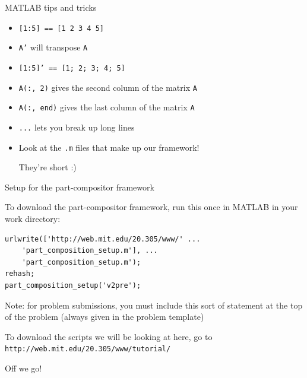 \documentclass[handout]{beamer} %
\newcommand{\br}{\vspace{\baselineskip}}
\begin{document}
\begin{frame}{MATLAB tips and tricks}
\begin{itemize}
    \item \texttt{[1:5] == [1 2 3 4 5]}
    \item \texttt{A'} will transpose \texttt{A}
    \item \texttt{[1:5]' == [1; 2; 3; 4; 5]}
    \item \texttt{A(:, 2)} gives the second column of the matrix \texttt{A}
    \item \texttt{A(:, end)} gives the last column of the matrix \texttt{A}
    \item \texttt{...} lets you break up long lines
    \item Look at the \texttt{.m} files that make up our framework!
    
    They're short :)
\end{itemize}
\end{frame}

\begin{frame}[fragile]{Setup for the part-compositor framework}

To download the part-compositor framework, run this once in MATLAB in
your work directory:

\begin{verbatim}
urlwrite(['http://web.mit.edu/20.305/www/' ...
    'part_composition_setup.m'], ...
    'part_composition_setup.m');
rehash;
part_composition_setup('v2pre');
\end{verbatim}

\pause

Note: for problem submissions, you must include this sort of statement at the top of the
problem (always given in the problem template)

\pause

\br
To download the scripts we will be looking at here, go to \texttt{http://web.mit.edu/20.305/www/tutorial/}

\pause

\br
Off we go!

\end{frame}
\end{document}
